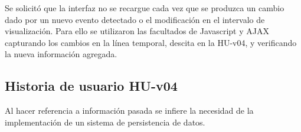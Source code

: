 Se solicitó que la interfaz no se recargue cada vez que se produzca un cambio dado por un nuevo evento detectado o el modificación en el intervalo de visualización. Para ello se utilizaron las facultados de Javascript y AJAX capturando los cambios en la línea temporal, descita en la HU-v04, y verificando la nueva información agregada.

\subsection{Historia de usuario HU-v04}
\label{subsec:HU-v04}

Al hacer referencia a información pasada se infiere la necesidad de la implementación de un sistema de persistencia de datos.\\












